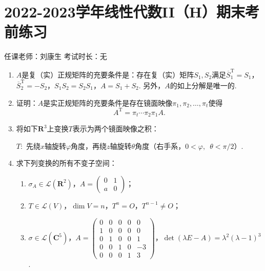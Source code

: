 \section{2022-2023学年线性代数II（H）期末考前练习}

\begin{center}
    任课老师：刘康生\hspace{4em} 考试时长：无
\end{center}

\begin{enumerate}
    \item $A$是复（实）正规矩阵的充要条件是：存在复（实）矩阵$S_1,S_2$满足$\overline{S}_1^{\mathrm{T}}=S_1$，$\overline{S}_2^{\mathrm{T}}=-S_2$，$S_1S_2=S_2S_1$，$A=S_1+S_2$. 另外，$A$的如上分解是唯一的.

    \item 证明：$A$是实正规矩阵的充要条件是存在镜面映像$\pi_1,\pi_2,\ldots,\pi_t$使得
    \[A^\mathrm{T}=\pi_t\cdots\pi_2\pi_1A.\]

    \item 将如下$\mathbf{R}^3$上变换$T$表示为两个镜面映像之积：

    $T\colon$ 先绕$x$轴旋转$\varphi$角度，再绕$z$轴旋转$\theta$角度（右手系，$0<\varphi,\enspace\theta < {\pi}/{2}$）.

    \item 求下列变换的所有不变子空间：
    \begin{enumerate}
        \item $\sigma_A\in\mathcal{L}(\mathbf{R}^2)$，$A=\begin{pmatrix}
            0 & 1 \\ a & 0
        \end{pmatrix}$；

        \item $T\in\mathcal{L}(V)$，$\dim V=n$，$T^n=O$，$T^{n-1}\neq O$；

        \item $\sigma\in\mathcal{L}(\mathbf{C}^5)$，$A=\begin{pmatrix}
            0 & 0 & 0 & 0 & 0 \\ 1 & 0 & 0 & 0 & 0 \\ 0 & 1 & 0 & 0 & 1 \\ 0 & 0 & 1 & 0 & -3 \\ 0 & 0 & 0 & 1 & 3
        \end{pmatrix}$，$\det(\lambda E-A)=\lambda^2(\lambda-1)^3$.
    \end{enumerate}


\end{enumerate}
